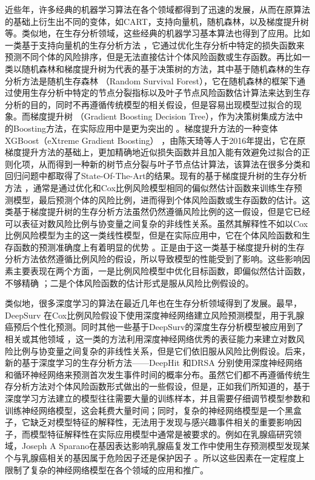 近些年，许多经典的机器学习算法在各个领域都得到了迅速的发展，从而在原算法的基础上衍生出不同的变体，如CART，支持向量机，随机森林，以及梯度提升树等。类似地，在生存分析领域，这些经典的机器学习基本算法也得到了应用。比如一类基于支持向量机的生存分析方法 ，它通过优化生存分析中特定的损失函数来预测不同个体的风险排序，但是无法直接估计个体风险函数或生存函数。再比如一类以随机森林和梯度提升树为代表的基于决策树的方法，其中基于随机森林的生存分析方法是随机生存森林 （Random Survival Forest），它在随机森林的框架下通过使用生存分析中特定的节点分裂指标以及叶子节点风险函数估计算法来达到生存分析的目的，同时不再遵循传统模型的相关假设，但是容易出现模型过拟合的现象。而梯度提升树 \cite{Ridgeway1999boost, Friedman2001gbm}（Gradient Boosting Decision Tree），作为决策树集成方法中的Boosting方法，在实际应用中是更为突出的 。梯度提升方法的一种变体XGBoost（eXtreme Gradient Boosting） ，由陈天琦等人于2016年提出，它在原梯度提升方法的基础上，更加精确地近似损失函数并且加入能有效避免过拟合的正则化项，从而得到一种新的树节点分裂与叶子节点估计算法，该算法在很多分类和回归问题中都取得了State-Of-The-Art的结果。现有的基于梯度提升树的生存分析方法 \cite{Ridgeway2007gbm, Binder2008Allowing}，通常是通过优化和Cox比例风险模型相同的偏似然估计函数来训练生存预测模型，最后预测个体的风险比例，进而得到个体风险函数或生存函数的估计。这类基于梯度提升树的生存分析方法虽然仍然遵循风险比例的这一假设，但是它已经可以表征对数风险比例与协变量之间复杂的非线性关系。虽然其解释性不如以Cox比例风险模型为主的这一类线性模型，但是在实际应用中，它在个体风险函数和生存函数的预测准确度上有着明显的优势 。正是由于这一类基于梯度提升树的生存分析方法依然遵循比例风险的假设，所以导致模型的性能受到了影响。这些影响因素主要表现在两个方面，一是比例风险模型中优化目标函数，即偏似然估计函数，不够精确 ；二是个体风险函数的估计形式是服从风险比例假设的。
    
类似地，很多深度学习的算法在最近几年也在生存分析领域得到了发展。最早，DeepSurv 在Cox比例风险假设下使用深度神经网络建立风险预测模型，用于乳腺癌预后个性化预测。同时其他一些基于DeepSurv的深度生存分析模型被应用到了相关或其他领域 ，这一类的方法利用深度神经网络优秀的表征能力来建立对数风险比例与协变量之间复杂的非线性关系，但是它们依旧服从风险比例假设。后来，新的基于深度学习的生存分析方法——DeepHit 和DRSA 分别使用深度神经网络和循环神经网络来预测首次发生事件时间的概率分布。虽然它们都不再遵循传统生存分析方法对个体风险函数形式做出的一些假设，但是，正如我们所知道的，基于深度学习方法建立的模型往往需要大量的训练样本，并且需要仔细调节模型参数和训练神经网络模型，这会耗费大量时间；同时，复杂的神经网络模型是一个黑盒子，它缺乏对模型特征的解释性，无法用于发现与感兴趣事件相关的重要影响因子，而模型特征解释性在实际应用模型中通常是被要求的。例如在乳腺癌研究领域，Joseph A Sparano在基因表达影响乳腺癌复发工作中使用生存预测模型发现某个与乳腺癌相关的基因属于危险因子还是保护因子 。所以这些因素在一定程度上限制了复杂的神经网络模型在各个领域的应用和推广。

